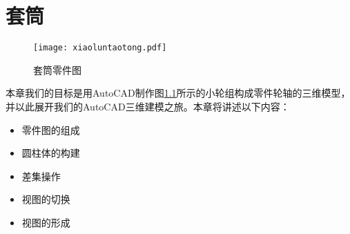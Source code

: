 \chapter{套筒}
\begin{figure}[htbp]
\centering
\texttt{[image: xiaoluntaotong.pdf]}
\caption{套筒零件图}\label{fig:xiaoluntaotong}
\end{figure}
本章我们的目标是用AutoCAD制作图\ref{fig:xiaoluntaotong}所示的小轮组构成零件轮轴的三维模型，并以此展开我们的AutoCAD三维建模之旅。本章将讲述以下内容：
\begin{itemize}
	\item 零件图的组成
	\item 圆柱体的构建
	\item 差集操作
	\item 视图的切换
	\item 视图的形成
\end{itemize}


\endinput